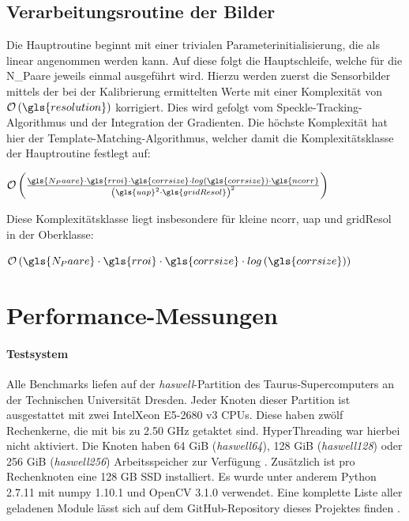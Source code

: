 \subsection{Verarbeitungsroutine der Bilder}

Die Hauptroutine beginnt mit einer trivialen Parameterinitialisierung, die als linear angenommen werden kann. Auf diese folgt die Hauptschleife, welche für die \gls{N_Paare} jeweils einmal ausgeführt wird. Hierzu werden zuerst die Sensorbilder mittels der bei der Kalibrierung ermittelten Werte mit einer Komplexität von $\mathcal{O}\left(\gls{resolution}\right)$ korrigiert. Dies wird gefolgt vom Speckle-Tracking-Algorithmus und der Integration der Gradienten. Die höchste Komplexität hat hier der Template-Matching-Algorithmus, welcher damit die Komplexitätsklasse der Hauptroutine festlegt auf:

\begin{center}
	$\mathcal{O}\left(\frac{\gls{N_Paare} \cdot\gls{rroi} \cdot \gls{corrsize} \cdot log\left(\gls{corrsize}\right) \cdot \gls{ncorr}}{\left(\gls{uap}^2 \cdot \gls{gridResol}\right)^2}\right)$
\end{center}

Diese Komplexitätsklasse liegt insbesondere für kleine \gls{ncorr}, \gls{uap} und \gls{gridResol} in der Oberklasse:

\begin{center}
	$\mathcal{O}\left(\gls{N_Paare} \cdot \gls{rroi} \cdot \gls{corrsize} \cdot log\left(\gls{corrsize}\right)\right)$
\end{center}

\section{Performance-Messungen}

\paragraph{Testsystem}

\begin{sloppypar}
Alle Benchmarks liefen auf der \textit{haswell}-Partition des Taurus-Supercomputers an der Technischen Universität Dresden. Jeder Knoten dieser Partition ist ausgestattet mit zwei Intel\textregistered \mbox{Xeon\textregistered} E5-2680 v3 \glspl{CPU}. Diese haben zwölf Rechenkerne, die mit bis zu 2.50 \gls{GHz} getaktet sind. HyperThreading war hierbei nicht aktiviert. Die Knoten haben 64 \gls{GiB} (\textit{haswell64}), 128 \gls{GiB} (\textit{haswell128}) oder 256 \gls{GiB} (\textit{haswell256}) Arbeitsspeicher zur Verfügung \cite{Mar17}. Zusätzlich ist pro Rechenknoten eine 128 \gls{GB} \gls{SSD} installiert. Es wurde unter anderem Python 2.7.11 mit numpy 1.10.1 und OpenCV 3.1.0 verwendet. Eine komplette Liste aller geladenen Module lässt sich auf dem GitHub-Repository dieses Projektes finden \cite{Sch18a}.
\end{sloppypar}

